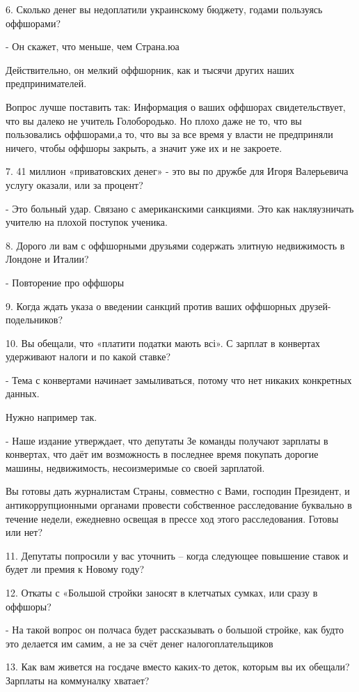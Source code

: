 \begin{itemize}
6. Сколько денег вы недоплатили украинскому бюджету, годами пользуясь
оффшорами?

- Он скажет, что меньше, чем Страна.юа

Действительно, он мелкий оффшорник, как и тысячи других наших предпринимателей.

Вопрос лучше поставить так: Информация о ваших оффшорах свидетельствует, что вы
далеко не учитель Голобородько. Но плохо даже не то, что вы пользовались
оффшорами,а то, что вы за все время у власти не предприняли ничего, чтобы
оффшоры закрыть, а значит уже их и не закроете.

7. 41 миллион «приватовских денег» - это вы по дружбе для Игоря Валерьевича
услугу оказали, или за процент?

- Это больный удар. Связано с американскими санкциями. Это как накляузничать
учителю на плохой поступок ученика.

8. Дорого ли вам с оффшорными друзьями содержать элитную недвижимость в Лондоне
и Италии?

- Повторение про оффшоры

9. Когда ждать указа о введении санкций против ваших оффшорных
друзей-подельников?

10. Вы обещали, что «платити податки мають всі». С зарплат в конвертах
удерживают налоги и по какой ставке?

- Тема с конвертами начинает замыливаться, потому что нет никаких конкретных
данных.

Нужно например так.

- Наше издание утверждает, что депутаты Зе команды получают зарплаты в
конвертах, что даёт им возможность в последнее время покупать дорогие машины,
недвижимость, несоизмеримые со своей зарплатой.

Вы готовы дать журналистам Страны, совместно с Вами, господин Президент, и
антикоррупционными органами провести собственное расследование буквально в
течение недели, ежедневно освещая в прессе ход этого расследования. Готовы или
нет?

11. Депутаты попросили у вас уточнить – когда следующее повышение ставок и
будет ли премия к Новому году?

12. Откаты с «Большой стройки заносят в клетчатых сумках, или сразу в оффшоры?

- На такой вопрос он полчаса будет рассказывать о большой стройке, как будто
это делается им самим, а не за счёт денег налогоплательщиков

13. Как вам живется на госдаче вместо каких-то деток, которым вы их обещали?
Зарплаты на коммуналку хватает?


\end{itemize}
